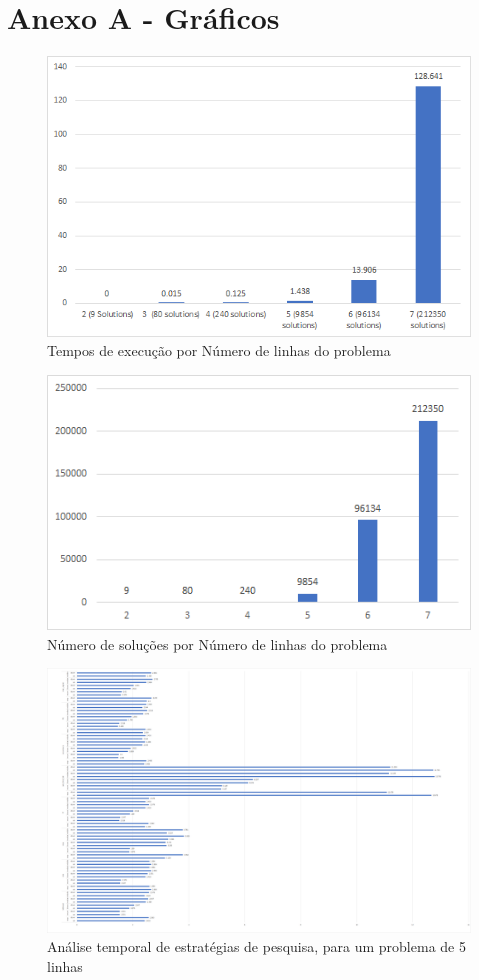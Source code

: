 \section{Anexo A - Gráficos}

\begin{figure}
    \centering
    \includegraphics[scale=0.9]{sizes.png}
    \caption{Tempos de execução por Número de linhas do problema}
    \label{fig: sizegraph}
\end{figure}

\begin{figure}
    \centering
    \includegraphics[scale=1.1]{solutions.png}
    \caption{Número de soluções por Número de linhas do problema}
    \label{fig: sizeresultsgraph}
\end{figure}

\begin{figure}
    \centering
    \includegraphics[angle=-90,scale=0.3]{heuristics.png}
    \caption{Análise temporal de estratégias de pesquisa, para um problema de 5 linhas}
    \label{fig: searchstrategy}
\end{figure}